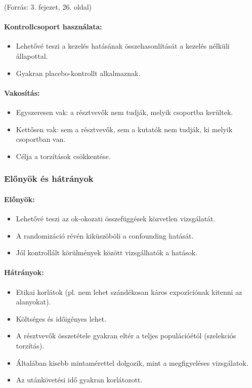 \documentclass[a4paper,12pt]{article}
\begin{document}
(Forrás: 3. fejezet, 26. oldal)

\paragraph{Kontrollcsoport használata:}
\begin{itemize}
    \item Lehetővé teszi a kezelés hatásának összehasonlítását a kezelés nélküli állapottal.
    \item Gyakran placebo-kontrollt alkalmaznak.
\end{itemize}

\paragraph{Vakosítás:}
\begin{itemize}
    \item Egyszeresen vak: a résztvevők nem tudják, melyik csoportba kerültek.
    \item Kettősen vak: sem a résztvevők, sem a kutatók nem tudják, ki melyik csoportban van.
    \item Célja a torzítások csökkentése.
\end{itemize}

\subsubsection{Előnyök és hátrányok}

\paragraph{Előnyök:}
\begin{itemize}
    \item Lehetővé teszi az ok-okozati összefüggések közvetlen vizsgálatát.
    \item A randomizáció révén kiküszöböli a confounding hatását.
    \item Jól kontrollált körülmények között vizsgálhatók a hatások.
\end{itemize}

\paragraph{Hátrányok:}
\begin{itemize}
    \item Etikai korlátok (pl. nem lehet szándékosan káros expozíciónak kitenni az alanyokat).
    \item Költséges és időigényes lehet.
    \item A résztvevők összetétele gyakran eltér a teljes populációétól (szelekciós torzítás).
    \item Általában kisebb mintamérettel dolgozik, mint a megfigyeléses vizsgálatok.
    \item Az utánkövetési idő gyakran korlátozott.
\end{itemize}
\end{document}
